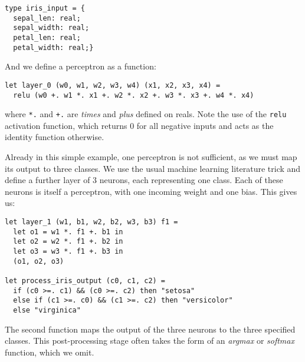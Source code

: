 \documentclass[runningheads]{llncs}
\begin{document}
\begin{lstlisting}
type iris_input = {
  sepal_len: real;
  sepal_width: real;
  petal_len: real;
  petal_width: real;}
\end{lstlisting}

\begin{comment}
To process inputs of this type in the future, we can simply define

\begin{lstlisting}
let process_iris_input (x: iris_input) =
  let x0 = x.sepal_len in
  let x1 = x.sepal_width in
  let x2 = x.petal_len in
  let x3 = x.petal_width in
  (x1, x2, x3, x4)
\end{lstlisting}
\end{comment}

And we define a perceptron as a function:

\begin{lstlisting}
let layer_0 (w0, w1, w2, w3, w4) (x1, x2, x3, x4) =
  relu (w0 +. w1 *. x1 +. w2 *. x2 +. w3 *. x3 +. w4 *. x4)
\end{lstlisting}
where \lstinline{*.} and   \lstinline{+.} are \emph{times} and \emph{plus} defined on reals.  Note the use of the \lstinline{relu} activation function, which returns $0$ for all negative inputs and acts as the identity function otherwise.

Already in this simple example, one perceptron is not sufficient, as we must map its output to three classes. We use the usual machine learning literature trick and define a further layer of $3$ neurons, each representing one class. Each of these neurons is itself a perceptron, with one incoming weight and one bias. This gives us:

\begin{lstlisting}
let layer_1 (w1, b1, w2, b2, w3, b3) f1 =
  let o1 = w1 *. f1 +. b1 in
  let o2 = w2 *. f1 +. b2 in
  let o3 = w3 *. f1 +. b3 in
  (o1, o2, o3)

let process_iris_output (c0, c1, c2) =
  if (c0 >=. c1) && (c0 >=. c2) then "setosa"
  else if (c1 >=. c0) && (c1 >=. c2) then "versicolor"
  else "virginica"
\end{lstlisting}

\noindent The second function maps the output of the three neurons to the three specified classes. This post-processing stage often takes the
form of an \emph{argmax} or \emph{softmax} function, which we omit. %
\end{document}
